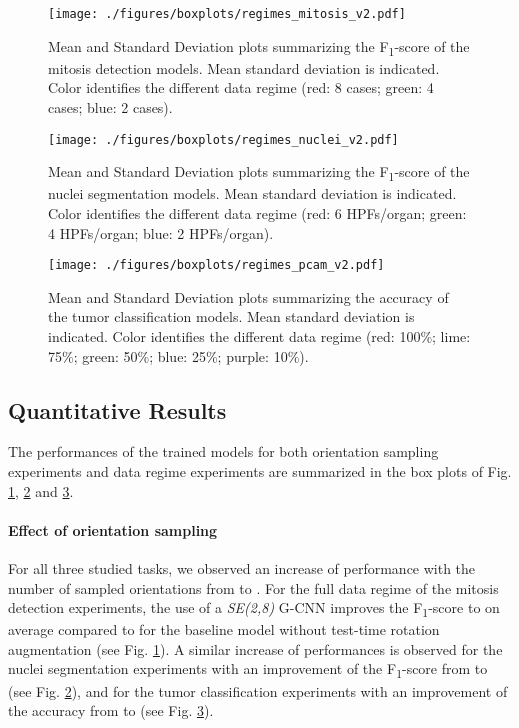 \documentclass[twocolumn,final]{article}
\newcommand{\fscore}[1]{F\textsubscript{#1}-score}
\newcommand{\se}[1]{\textit{SE(#1)}}
\begin{document}
\begin{figure}[ht!]
\begin{center}
\texttt{[image: ./figures/boxplots/regimes\_mitosis\_v2.pdf]}
\caption{
\footnotesize
Mean and Standard Deviation plots summarizing the \fscore{1} of the mitosis detection models.
Mean  standard deviation is indicated.
Color identifies the different data regime (red: 8 cases; green: 4 cases; blue: 2 cases).}
\label{fig:boxPlotMitosis}
\end{center}
\end{figure}

\begin{figure}[ht!]
\begin{center}
\texttt{[image: ./figures/boxplots/regimes\_nuclei\_v2.pdf]}
\caption{
\footnotesize
Mean and Standard Deviation plots summarizing the \fscore{1} of the nuclei segmentation models.
Mean  standard deviation is indicated.
Color identifies the different data regime (red: 6 HPFs/organ; green: 4 HPFs/organ; blue: 2 HPFs/organ).}
\label{fig:boxPlotNuclei}
\end{center}
\end{figure}

\begin{figure}[ht!]
\begin{center}
\texttt{[image: ./figures/boxplots/regimes\_pcam\_v2.pdf]}
\caption{
\footnotesize
Mean and Standard Deviation plots summarizing the accuracy of the tumor classification models.
Mean  standard deviation  is indicated.
Color identifies the different data regime (red: 100\%; lime: 75\%; green: 50\%; blue: 25\%; purple: 10\%).}
\label{fig:boxPlotTumor}
\end{center}
\end{figure}

\subsection{Quantitative Results}
\label{quantitativeResults}
The performances of the trained models for both orientation sampling experiments and data regime experiments are summarized in the box plots of Fig. \ref{fig:boxPlotMitosis}, \ref{fig:boxPlotNuclei} and \ref{fig:boxPlotTumor}.

\paragraph{Effect of orientation sampling} 
For all three studied tasks, we observed an increase of performance with the number of sampled orientations from  to .
For the full data regime of the mitosis detection experiments, the use of a \se{2,8} G-CNN improves the \fscore{1} to  on average compared to  for the baseline model without test-time rotation augmentation (see Fig. \ref{fig:boxPlotMitosis}).
A similar increase of performances is observed for the nuclei segmentation experiments with an improvement of the \fscore{1} from  to  (see Fig. \ref{fig:boxPlotNuclei}), and for the tumor classification experiments with an improvement of the accuracy from  to  (see Fig. \ref{fig:boxPlotTumor}).
\end{document}
